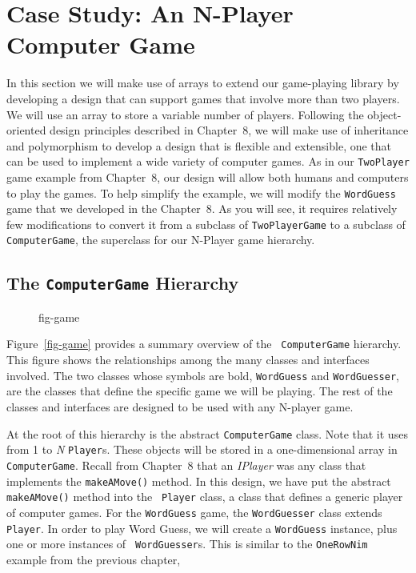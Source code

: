 \section{Case Study: An N-Player Computer Game}

\noindent In this section we will make use of arrays to extend our
game-playing library by developing a design that can support games
that involve more than two players. We will use an array to store a
variable number of players. Following the object-oriented design
principles described in Chapter~8, we will make use of inheritance and
polymorphism to develop a design that is flexible and extensible, 
one that can be used to implement a wide variety of computer games.
As in our {\tt TwoPlayer} game example from Chapter~8, our design will
allow both humans and computers to play the games.  To help simplify
the example, we will modify the {\tt WordGuess} game that we developed
in the Chapter~8. As you will see, it requires relatively few
modifications to convert it from a subclass of {\tt TwoPlayerGame} to
a subclass of {\tt ComputerGame}, the superclass for our N-Player game
hierarchy.

\subsection{The {\tt ComputerGame} Hierarchy}

\begin{figure}[bt]
 {fig-game}

\end{figure}

Figure~\ref{fig-game} provides a summary overview of the {\tt
ComputerGame} hierarchy.  This figure shows the relationships
among the many classes and interfaces involved.  The two classes whose
symbols are bold, {\tt WordGuess} and {\tt WordGuesser}, are the
classes that define the specific game we will be playing.  The
rest of the classes and interfaces are designed to be used with
any N-player game. 

At the root of this hierarchy is the abstract {\tt ComputerGame}
class.  Note that it uses from 1 to {\em N} {\tt Player}s. These
objects will be stored in a one-dimensional array in {\tt
ComputerGame}.  Recall from Chapter~8 that an {\em IPlayer} was any
class that implements the {\tt makeAMove()} method.  In this design,
we have put the abstract {\tt makeAMove()} method into the {\tt
Player} class, a class that defines a generic player of computer
games.  For the {\tt WordGuess} game, the {\tt WordGuesser} class
extends {\tt Player}.  In order to play Word Guess, we will create a
{\tt WordGuess} instance, plus one or more instances of {\tt
WordGuesser}s. This is similar to the {\tt OneRowNim} example from the
previous chapter,

